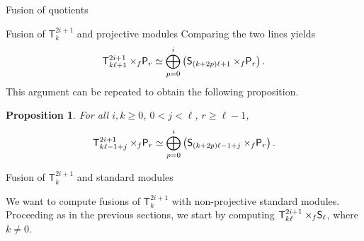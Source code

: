 \documentclass[reqno]{amsart}
\newtheorem{Prop}[Thm]{Proposition}
\newcommand{\ds}[1]{\mathsf S_{#1}}
\newcommand{\dP}[1]{\mathsf P_{#1}}
\newcommand{\xf}{\times\hspace{-0.27em}_f}
\newcommand{\T}[2]{\mathsf{T}^{#1}_{#2}}
\newcommand{\lc}{\ell}
\begin{document}
\begin{section}{Fusion of quotients}
\begin{subsection}{Fusion of $\T{2i+1}{k}$ and projective modules}
Comparing the two lines yields
\begin{equation}
\T{2i+1}{k\lc+1} \xf \dP{r} \simeq \overset{i}{\underset{p=0}{\bigoplus}}\left( \ds{(k+2p)\lc+1} \xf \dP{r}\right).
\end{equation}
This argument can be repeated to obtain the following proposition.
\begin{Prop}
For all $i,k \geq 0 $, $0<j<\lc$, $r\geq \lc-1$,
\begin{equation}
\T{2i+1}{k\lc-1+j} \xf \dP{r} \simeq \overset{i}{\underset{p=0}{\bigoplus}}\left( \ds{(k+2p)\lc-1+j} \xf \dP{r}\right).
\end{equation}
\end{Prop}
\end{subsection}
\begin{subsection}{Fusion of $\T{2i+1}{k}$ and standard modules}\label{sec:fusionTvsS}

We want to compute fusions of $\T{2i+1}{k}$ with non-projective standard modules. Proceeding as in the previous sections,  we start by computing $\T{2i+1}{k\lc}\xf \ds{\lc}$, where $k\neq 0$. 


\end{subsection}
\end{section}
\end{document}
